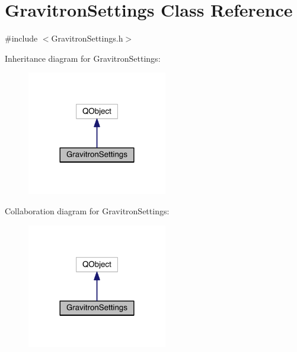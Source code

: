 \hypertarget{class_gravitron_settings}{\section{Gravitron\+Settings Class Reference}
\label{class_gravitron_settings}
}


{\ttfamily \#include $<$Gravitron\+Settings.\+h$>$}



Inheritance diagram for Gravitron\+Settings\+:\nopagebreak
\begin{figure}[H]
\begin{center}
\leavevmode
\includegraphics[width=173pt]{class_gravitron_settings__inherit__graph}
\end{center}
\end{figure}


Collaboration diagram for Gravitron\+Settings\+:\nopagebreak
\begin{figure}[H]
\begin{center}
\leavevmode
\includegraphics[width=173pt]{class_gravitron_settings__coll__graph}
\end{center}
\end{figure}
